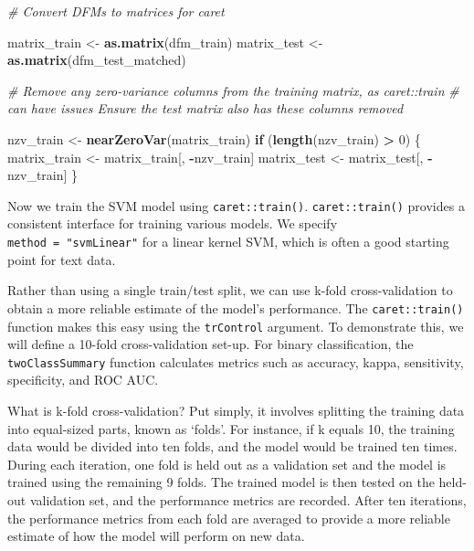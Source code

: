 \documentclass[
]{book}
\newenvironment{Shaded}{\begin{snugshade}}{\end{snugshade}}
\newcommand{\CommentTok}[1]{\textcolor[rgb]{0.56,0.35,0.01}{\textit{#1}}}
\newcommand{\ControlFlowTok}[1]{\textcolor[rgb]{0.13,0.29,0.53}{\textbf{#1}}}
\newcommand{\DecValTok}[1]{\textcolor[rgb]{0.00,0.00,0.81}{#1}}
\newcommand{\FunctionTok}[1]{\textcolor[rgb]{0.13,0.29,0.53}{\textbf{#1}}}
\newcommand{\NormalTok}[1]{#1}
\newcommand{\OtherTok}[1]{\textcolor[rgb]{0.56,0.35,0.01}{#1}}
\newcommand{\SpecialCharTok}[1]{\textcolor[rgb]{0.81,0.36,0.00}{\textbf{#1}}}
\begin{document}
\begin{Shaded}
\begin{Highlighting}[]
\CommentTok{\# Convert DFMs to matrices for caret}

\NormalTok{matrix\_train }\OtherTok{\textless{}{-}} \FunctionTok{as.matrix}\NormalTok{(dfm\_train)}
\NormalTok{matrix\_test }\OtherTok{\textless{}{-}} \FunctionTok{as.matrix}\NormalTok{(dfm\_test\_matched)}

\CommentTok{\# Remove any zero{-}variance columns from the training matrix, as caret::train}
\CommentTok{\# can have issues Ensure the test matrix also has these columns removed}

\NormalTok{nzv\_train }\OtherTok{\textless{}{-}} \FunctionTok{nearZeroVar}\NormalTok{(matrix\_train)}
\ControlFlowTok{if}\NormalTok{ (}\FunctionTok{length}\NormalTok{(nzv\_train) }\SpecialCharTok{\textgreater{}} \DecValTok{0}\NormalTok{) \{}
\NormalTok{    matrix\_train }\OtherTok{\textless{}{-}}\NormalTok{ matrix\_train[, }\SpecialCharTok{{-}}\NormalTok{nzv\_train]}
\NormalTok{    matrix\_test }\OtherTok{\textless{}{-}}\NormalTok{ matrix\_test[, }\SpecialCharTok{{-}}\NormalTok{nzv\_train]}
\NormalTok{\}}
\end{Highlighting}
\end{Shaded}

Now we train the SVM model using \texttt{caret::train()}. \texttt{caret::train()} provides a consistent interface for training various models. We specify \texttt{method\ =\ "svmLinear"} for a linear kernel SVM, which is often a good starting point for text data.

Rather than using a single train/test split, we can use k-fold cross-validation to obtain a more reliable estimate of the model's performance. The \texttt{caret::train()} function makes this easy using the \texttt{trControl} argument. To demonstrate this, we will define a 10-fold cross-validation set-up. For binary classification, the \texttt{twoClassSummary} function calculates metrics such as accuracy, kappa, sensitivity, specificity, and ROC AUC.

What is k-fold cross-validation? Put simply, it involves splitting the training data into equal-sized parts, known as `folds'. For instance, if k equals 10, the training data would be divided into ten folds, and the model would be trained ten times. During each iteration, one fold is held out as a validation set and the model is trained using the remaining 9 folds. The trained model is then tested on the held-out validation set, and the performance metrics are recorded. After ten iterations, the performance metrics from each fold are averaged to provide a more reliable estimate of how the model will perform on new data.
\end{document}

